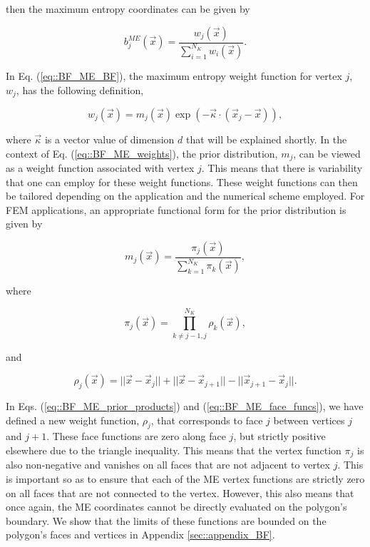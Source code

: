 \noindent then the maximum entropy coordinates can be given by

\begin{equation}
\label{eq::BF_ME_BF}
b_{j}^{ME} (\vec{x}) = \frac{w_j (\vec{x}) }{\sum\limits_{i=1}^{N_K} w_i (\vec{x})} .
\end{equation}

\noindent In Eq. (\ref{eq::BF_ME_BF}), the maximum entropy weight function for vertex $j$, $w_j$, has the following definition,

\begin{equation}
\label{eq::BF_ME_weights}
w_j (\vec{x})  = m_j(\vec{x}) \exp(-  \vec{\kappa} \cdot (\vec{x}_j - \vec{x})),
\end{equation}

\noindent where $\vec{\kappa}$ is a vector value of dimension $d$ that will be explained shortly. In the context of Eq. (\ref{eq::BF_ME_weights}), the prior distribution, $m_j$, can be viewed as a weight function associated with vertex $j$. This means that there is variability that one can employ for these weight functions. These weight functions can then be tailored depending on the application and the numerical scheme employed. For FEM applications, an appropriate functional form for the prior distribution is given by

\begin{equation}
\label{eq::BF_ME_prior_funcs}
 m_j(\vec{x}) = \frac{\pi_j (\vec{x}) }{\sum\limits_{k=1}^{N_K} \pi_k (\vec{x})},
\end{equation}

\noindent where

\begin{equation}
\label{eq::BF_ME_prior_products}
\pi_j (\vec{x}) = \prod\limits_{k \neq j-1, j}^{N_K} \rho_k (\vec{x}),
\end{equation}

\noindent and

\begin{equation}
\label{eq::BF_ME_face_funcs}
\rho_j (\vec{x}) = || \vec{x} - \vec{x}_j || + || \vec{x} - \vec{x}_{j+1} || - || \vec{x}_{j+1} - \vec{x}_j || .
\end{equation}

\noindent In Eqs. (\ref{eq::BF_ME_prior_products}) and (\ref{eq::BF_ME_face_funcs}), we have defined a new weight function, $\rho_j$, that corresponds to face $j$ between vertices $j$ and $j+1$. These face functions are zero along face $j$, but strictly positive elsewhere due to the triangle inequality. This means that the vertex function $\pi_j$ is also non-negative and vanishes on all faces that are not adjacent to vertex $j$. This is important so as to ensure that each of the ME vertex functions are strictly zero on all faces that are not connected to the vertex. However, this also means that once again, the ME coordinates cannot be directly evaluated on the polygon's boundary. We show that the limits of these functions are bounded on the polygon's faces and vertices in Appendix \ref{sec::appendix_BF}.


